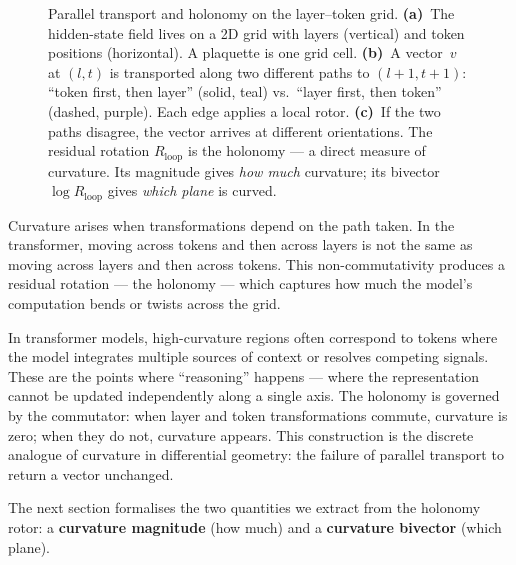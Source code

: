 \documentclass[11pt, twoside, openright]{memoir}
\numberwithin{equation}{chapter}
\begin{document}
\begin{figure}[ht]

\caption{Parallel transport and holonomy on the layer--token grid.
\textbf{(a)}~The hidden-state field lives on a 2D grid with layers
(vertical) and token positions (horizontal).  A plaquette is one grid
cell.
\textbf{(b)}~A vector~$v$ at $(l,t)$ is transported along two
different paths to $(l\!+\!1, t\!+\!1)$: ``token first, then layer''
(solid, teal) vs.\ ``layer first, then token'' (dashed, purple).
Each edge applies a local rotor.
\textbf{(c)}~If the two paths disagree, the vector arrives at
different orientations.  The residual rotation $R_{\text{loop}}$ is
the holonomy --- a direct measure of curvature.  Its magnitude gives
\emph{how much} curvature; its bivector $\log R_{\text{loop}}$ gives
\emph{which plane} is curved.}
\label{fig:holonomy}
\end{figure}

Curvature arises when transformations depend on the path taken.
In the transformer, moving across tokens and then across layers is
not the same as moving across layers and then across tokens.  This
non-commutativity produces a residual rotation --- the holonomy ---
which captures how much the model's computation bends or twists
across the grid.

\begin{transformer}
In transformer models, high-curvature regions often correspond to
tokens where the model integrates multiple sources of context or
resolves competing signals.  These are the points where ``reasoning''
happens --- where the representation cannot be updated independently
along a single axis.  The holonomy is governed by the commutator:
when layer and token transformations commute, curvature is zero;
when they do not, curvature appears.  This construction is the
discrete analogue of curvature in differential geometry: the failure
of parallel transport to return a vector unchanged.
\end{transformer}

The next section formalises the two quantities we extract from the
holonomy rotor: a \textbf{curvature magnitude} (how much) and a
\textbf{curvature bivector} (which plane).
\end{document}
